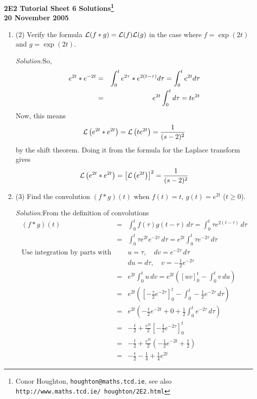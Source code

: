 \documentclass[12pt]{article}
\newcommand{\soln}{\noindent\textit{Solution:}}
\begin{document}
\begin{center}

{\bf 2E2 Tutorial Sheet 6 Solutions\footnote{Conor Houghton, {\tt houghton@maths.tcd.ie}, see also {\tt http://www.maths.tcd.ie/ houghton/2E2.html}}\\[1cm] 20 November 2005}
\end{center}


\renewcommand{\labelenumi}{\arabic{enumi}.}


\begin{enumerate}

\item (2) Verify the formula ${\cal L}(f*g)={\cal L}(f){\cal L}(g)$ in the case where $f=\exp{(2t)}$ and $g=\exp{(2t)}$. 

\soln So, 
\begin{eqnarray}
e^{2t}*e^{-2t}
&=&\int_0^t e^{2\tau}*e^{2(t-\tau)}d\tau=\int_0^t e^{2t}d\tau\cr
&=&e^{2t}\int_0^td\tau=te^{2t}
\end{eqnarray}
Now, this means
\begin{equation}
{\cal L}\left(e^{2t}*e^{2t}\right)={\cal L}\left(te^{2t}\right)=\frac{1}{(s-2)^2}
\end{equation}
by the shift theorem. Doing it from the formula for the Laplace transform gives
\begin{equation}
{\cal L}\left(e^{2t}*e^{2t}\right)=\left[{\cal L}\left(e^{2t}\right)\right]^2=\frac{1}{(s-2)^2}
\end{equation}


\item (3) Find the convolution $(f*g)(t)$ when $f(t) = t$, $g(t) = e^{2t}$ ($t
\geq 0$).

\soln From the definition of convolutions
\begin{eqnarray*}
(f*g)(t) &=& \int_0^t f(\tau ) g(t-\tau ) \, d\tau 
= \int_0^t \tau  e^{2(t-\tau )} \, d\tau\\ 
&=& \int_0^t \tau  e^{2t} e^{-2\tau } \, d\tau 
= e^{2t} \int_0^t \tau  e^{-2\tau } \, d\tau \\
\mbox{Use integration by parts with}
&& u = \tau , \quad dv = e^{-2\tau } \, d\tau \\
&& du = d\tau , \quad v = -\frac{1}{2} e^{-2\tau }\\
&=& e^{2t} \int_0^t u \, dv
= e^{2t} \left( \left[ uv \right]_0^t - \int_0^t v \, du \right)\\
&=& e^{2t} \left( \left[ - \frac{\tau }{2}e^{-2\tau } \right]_0^t - \int_0^t
-\frac{1}{2} e^{-2\tau } \, d\tau  \right)\\
&=& e^{2t} \left( - \frac{t}{2} e^{-2t} + 0 + \frac{1}{2} \int_0^t
e^{-2\tau } \, d\tau  \right)\\
&=& - \frac{t}{2} + \frac{e^{2t}}{2} \left[ -\frac{1}{2} e^{-2\tau }
\right]_0^t\\
&=& - \frac{t}{2} + \frac{e^{2t}}{2} \left( -\frac{1}{2} e^{-2t} +
\frac{1}{2} \right)\\
&=& - \frac{t}{2} - \frac{1}{4} + \frac{1}{4} e^{2t}
\end{eqnarray*}


\end{enumerate}
\end{document}
